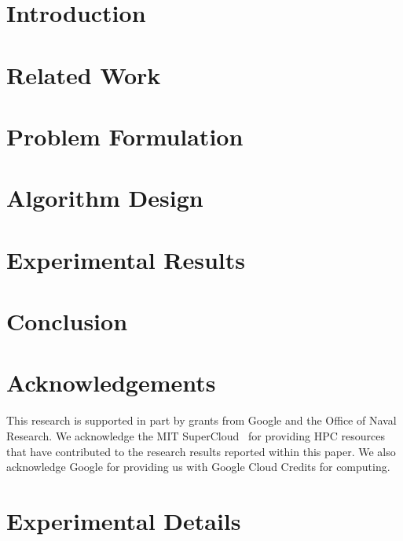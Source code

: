 \documentclass{article}
\begin{document}
\vspace{-5pt}
\section{Introduction}
\label{sec:introduction}
\vspace{-5pt}


\vspace{-5pt}
\section{Related Work}
\label{sec:related-work}
\vspace{-5pt}


\vspace{-5pt}
\section{Problem Formulation}
\label{sec:optimization-formulation}
\vspace{-5pt}


\vspace{-5pt}
\section{Algorithm Design}
\label{sec:algorithm-design}
\vspace{-5pt}



\vspace{-5pt}
\section{Experimental Results}
\label{sec:experimental-results}
\vspace{-5pt}


\vspace{-15pt}
\section{Conclusion}
\label{sec:conclusion}
\vspace{-5pt}


\section*{Acknowledgements}
This research is supported in part by grants from Google and the Office of Naval Research. We acknowledge the MIT SuperCloud~\cite{reuther2018interactive} for providing HPC resources that have contributed to the research results reported within this paper. We also acknowledge Google for providing us with Google Cloud Credits for computing. 

\clearpage



\clearpage


\appendix

\section{Experimental Details}
\label{supp:experiments-supp}

\end{document}
